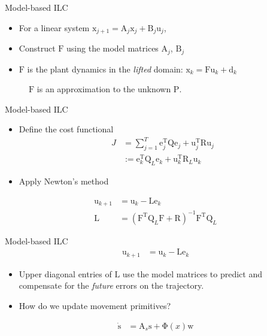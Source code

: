 \documentclass[handout]{beamer}
\newcommand{\boldvec}[1]{\boldsymbol{\mathrm{#1}}}
\let\vec\boldvec
\newcommand{\state}{\vec{x}} %
\newcommand{\dmp}{\vec{s}} %
\newcommand{\error}{\vec{e}} %
\newcommand{\linDist}{\vec{d}} %
\newcommand{\sysInput}{\vec{u}} %
\newcommand{\phase}{x} %
\newcommand{\weights}{\vec{w}} %
\newcommand{\basis}{\vec{\Phi}} %
\newcommand{\lmatrix}{\vec{L}} %
\newcommand{\ValueFunction}{J}
\begin{document}
%
\begin{frame}{Model-based ILC}
\begin{itemize}
\item For a linear system $\state_{j+1} = \boldvec{A}_j\state_j + \boldvec{B}_j\sysInput_j$,
\item Construct $\vec{F}$ using the model matrices $\vec{A}_j$, $\vec{B}_j$
\item $\vec{F}$ is the plant dynamics in the \emph{lifted} domain: $\state_k = \vec{F}\sysInput_k + \linDist_k$
\end{itemize}
\begin{figure}
\centering
\def\svgwidth{250pt}

\caption{$\vec{F}$ is an approximation to the unknown $\vec{P}$.}
\end{figure}
\end{frame}
%
\begin{frame}{Model-based ILC}
\begin{itemize}
\item Define the cost functional
\begin{equation}
\begin{aligned}
\ValueFunction &= \sum_{j=1}^{T} \error_j^{\mathrm{T}}\vec{Q}\error_j + \sysInput_j^{\mathrm{T}}\vec{R}\sysInput_j \\ 
&:= \error_k^{\mathrm{T}}\vec{Q}_L\error_k + \sysInput_k^{\mathrm{T}}\vec{R}_L\sysInput_k
\end{aligned}
\end{equation}
\item Apply Newton's method
\end{itemize}
\begin{equation*}
\begin{aligned}
\sysInput_{k+1} &= \sysInput_{k} - \lmatrix\error_{k} \\
\lmatrix &= (\vec{F}^{\mathrm{T}}\vec{Q}_L\vec{F} + \vec{R})^{-1}\vec{F}^{\mathrm{T}}\vec{Q}_L
\end{aligned}
\end{equation*}
\end{frame}
%
\begin{frame}{Model-based ILC}
\begin{equation*}
\begin{aligned}
\sysInput_{k+1} &= \sysInput_{k} - \lmatrix\error_{k}
\end{aligned}
\end{equation*}
\begin{itemize}
\item Upper diagonal entries of $\lmatrix$ use the model matrices to predict and compensate for the \emph{future} errors on the trajectory. 
\item How do we update movement primitives?
\end{itemize}
\begin{equation}
\begin{aligned}
\dot{\dmp} &= \vec{A}_s \dmp + \basis(\phase) \weights \\
\label{dmp2}
\end{aligned}
\end{equation}
\end{frame}
\end{document}
